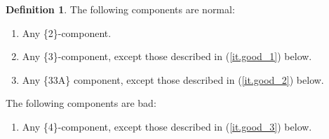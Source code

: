 \documentclass[10pt, reqno]{amsart}
\theoremstyle{definition}
\newtheorem{definition}[theorem]{Definition}
\theoremstyle{remark}
\numberwithin{equation}{section}
\begin{document}
\begin{definition}
\label{def.good_normal} The following components are normal:
\begin{enumerate}
\item Any \{2\}-component.
\item Any \{3\}-component, except those described in (\ref{it.good_1}) below.
\item Any \{33A\} component, except those described in (\ref{it.good_2}) below.
\end{enumerate}

The following components are bad:
\begin{enumerate}[resume]
\item Any \{4\}-component, except those described in (\ref{it.good_3}) below. 
\end{enumerate}


\end{definition}
\end{document}
